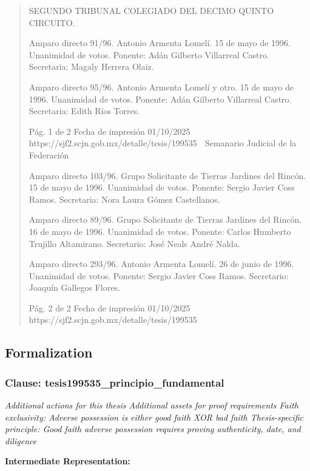 \documentclass[11pt,a4paper]{article}
\begin{document}
\begin{quote}
SEGUNDO TRIBUNAL COLEGIADO DEL DECIMO QUINTO CIRCUITO.


Amparo directo 91/96. Antonio Armenta Lomelí. 15 de mayo de 1996. Unanimidad de votos.
Ponente: Adán Gilberto Villarreal Castro. Secretaria: Magaly Herrera Olaiz.

Amparo directo 95/96. Antonio Armenta Lomelí y otro. 15 de mayo de 1996. Unanimidad de votos.
Ponente: Adán Gilberto Villarreal Castro. Secretaria: Edith Ríos Torres.



                                              Pág. 1 de 2             Fecha de impresión 01/10/2025
  https://sjf2.scjn.gob.mx/detalle/tesis/199535
                                                  Semanario Judicial de la Federación

Amparo directo 103/96. Grupo Solicitante de Tierras Jardines del Rincón. 15 de mayo de 1996.
Unanimidad de votos. Ponente: Sergio Javier Coss Ramos. Secretaria: Nora Laura Gómez
Castellanos.

Amparo directo 89/96. Grupo Solicitante de Tierras Jardines del Rincón. 16 de mayo de 1996.
Unanimidad de votos. Ponente: Carlos Humberto Trujillo Altamirano. Secretario: José Neals André
Nalda.

Amparo directo 293/96. Antonio Armenta Lomelí. 26 de junio de 1996. Unanimidad de votos.
Ponente: Sergio Javier Coss Ramos. Secretario: Joaquín Gallegos Flores.




                                             Pág. 2 de 2        Fecha de impresión 01/10/2025
  https://sjf2.scjn.gob.mx/detalle/tesis/199535

\end{quote}

\subsection{Formalization}

\subsubsection{Clause: tesis199535\_principio\_fundamental}

\textit{Additional actions for this thesis Additional assets for proof requirements Faith exclusivity: Adverse possession is either good faith XOR bad faith Thesis-specific principle: Good faith adverse possession requires proving authenticity, date, and diligence}

\textbf{Intermediate Representation:}
\end{document}
